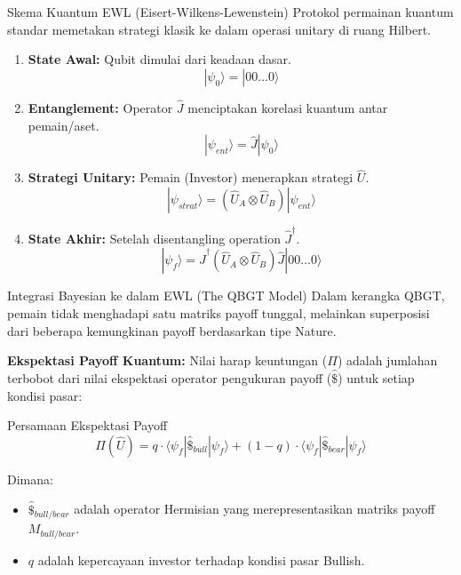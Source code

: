 \documentclass{beamer}
\begin{document}
\begin{frame}{Skema Kuantum EWL (Eisert-Wilkens-Lewenstein)}
    Protokol permainan kuantum standar memetakan strategi klasik ke dalam operasi unitary di ruang Hilbert.
    
    \begin{enumerate}
        \item \textbf{State Awal:} Qubit dimulai dari keadaan dasar.
        $$ |\psi_0\rangle = |00\dots0\rangle $$
        
        \item \textbf{Entanglement:} Operator $\hat{J}$ menciptakan korelasi kuantum antar pemain/aset.
        $$ |\psi_{ent}\rangle = \hat{J} |\psi_0\rangle $$
        
        \item \textbf{Strategi Unitary:} Pemain (Investor) menerapkan strategi $\hat{U}$.
        $$ |\psi_{strat}\rangle = (\hat{U}_A \otimes \hat{U}_B) |\psi_{ent}\rangle $$
        
        \item \textbf{State Akhir:} Setelah disentangling operation $\hat{J}^\dagger$.
        $$ |\psi_f\rangle = \hat{J}^\dagger (\hat{U}_A \otimes \hat{U}_B) \hat{J} |00\dots0\rangle $$
    \end{enumerate}
\end{frame}

\begin{frame}{Integrasi Bayesian ke dalam EWL (The QBGT Model)}
    Dalam kerangka QBGT, pemain tidak menghadapi satu matriks payoff tunggal, melainkan superposisi dari beberapa kemungkinan payoff berdasarkan tipe Nature.
    
    \vspace{0.3cm}
    \textbf{Ekspektasi Payoff Kuantum:}
    Nilai harap keuntungan ($\Pi$) adalah jumlahan terbobot dari nilai ekspektasi operator pengukuran payoff ($\hat{\$}$) untuk setiap kondisi pasar:
    
    \begin{block}{Persamaan Ekspektasi Payoff}
    $$ \Pi(\hat{U}) = q \cdot \langle \psi_f | \hat{\$}_{bull} | \psi_f \rangle + (1-q) \cdot \langle \psi_f | \hat{\$}_{bear} | \psi_f \rangle $$
    \end{block}
    
    Dimana:
    \begin{itemize}
        \item $\hat{\$}_{bull/bear}$ adalah operator Hermisian yang merepresentasikan matriks payoff $M_{bull/bear}$.
        \item $q$ adalah kepercayaan investor terhadap kondisi pasar Bullish.
    \end{itemize}
\end{frame}
\end{document}
